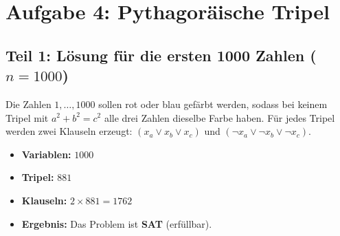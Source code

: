 \documentclass[11pt, a4paper]{article}
\begin{document}
\newpage
\section*{Aufgabe 4: Pythagoräische Tripel}

\subsection*{Teil 1: Lösung für die ersten 1000 Zahlen ($n = 1000$)}

Die Zahlen $1, \dots, 1000$ sollen rot oder blau gefärbt werden, sodass bei keinem Tripel mit $a^2 + b^2 = c^2$ alle drei Zahlen dieselbe Farbe haben. Für jedes Tripel werden zwei Klauseln erzeugt: $(x_a \lor x_b \lor x_c)$ und $(\neg x_a \lor \neg x_b \lor \neg x_c)$.

\begin{itemize}\setlength{\itemsep}{1pt}
    \item \textbf{Variablen:} $1000$
    \item \textbf{Tripel:} $881$
    \item \textbf{Klauseln:} $2 \times 881 = 1762$
    \item \textbf{Ergebnis:} Das Problem ist \textbf{SAT} (erfüllbar).
\end{itemize}
\end{document}

